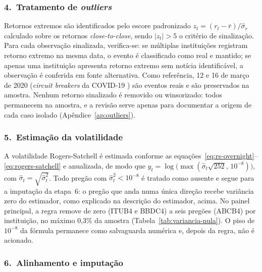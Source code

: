 \documentclass[12pt, a4paper, oneside, english, brazil]{abntex2}
\begin{document}
\subsubsection*{4.\ Tratamento de \textit{outliers}}

Retornos extremos são identificados pelo escore padronizado
$z_t = (r_t - \bar{r})/\hat{\sigma}_r$ calculado sobre os retornos
\textit{close-to-close}, sendo $|z_t| > 5$ o critério de sinalização. Para cada
observação sinalizada, verifica-se: se múltiplas instituições registram retorno extremo na
mesma data, o evento é classificado como real e mantido; se apenas uma instituição
apresenta retorno extremo sem notícia identificável, a observação é conferida em fonte
alternativa. Como referência, 12 e 16 de março
de 2020 (\textit{circuit breakers} da COVID-19 \parencite{infomoney2020cb}) são eventos reais e são preservados na amostra.
Nenhum retorno sinalizado é removido ou winsorizado: todos permanecem na amostra, e a revisão
serve apenas para documentar a origem de cada caso isolado
(Apêndice~\ref{ap:outliers}).

\subsubsection*{5.\ Estimação da volatilidade}

A volatilidade Rogers-Satchell é estimada conforme as
equações~\ref{eq:rs-overnight}--\ref{eq:rogers-satchell} e anualizada, de modo
que $y_t = \log\bigl(\max(\hat{\sigma}_t\sqrt{252},\,10^{-8})\bigr)$, com
$\hat{\sigma}_t = \sqrt{\hat{\sigma}^2_t}$. Todo pregão com
$\hat{\sigma}^2_t < 10^{-8}$ é tratado como ausente e segue para a imputação
da etapa~6: o pregão que anda numa única direção recebe variância zero do
estimador, como explicado na descrição do estimador, acima. No painel
principal, a regra remove de zero (ITUB4 e BBDC4) a seis pregões (ABCB4) por
instituição, no máximo 0,3\% da amostra (Tabela~\ref{tab:variancia-nula}). O
piso de $10^{-8}$ da fórmula permanece como salvaguarda numérica e, depois da
regra, não é acionado.

\subsubsection*{6.\ Alinhamento e imputação}
\end{document}
